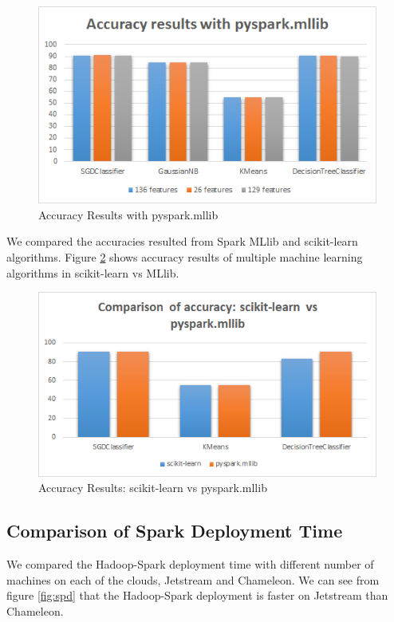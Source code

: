 \documentclass[9pt,twocolumn,twoside]{../../styles/osajnl}
\begin{document}
\begin{figure}[h]
\centering
\includegraphics[width=\linewidth,scale=1]{images/accmllib}
\caption{Accuracy Results with pyspark.mllib}
\label{fig:accmllib}
\end{figure}

We compared the accuracies resulted from Spark MLlib and scikit-learn algorithms. Figure \ref{fig:mllibvssklearn} shows accuracy results of multiple machine learning algorithms in scikit-learn vs MLlib.

\begin{figure}[h]
\centering
\includegraphics[width=\linewidth,scale=1]{images/mllibvssklearn}
\caption{Accuracy Results: scikit-learn vs pyspark.mllib}
\label{fig:mllibvssklearn}
\end{figure}


\subsection{Comparison of Spark Deployment Time}

We compared the Hadoop-Spark deployment time with different number of machines on each of the clouds, Jetstream and Chameleon. We can see from figure \ref{fig:spd} that the Hadoop-Spark deployment is faster on Jetstream than  Chameleon. 
\end{document}
